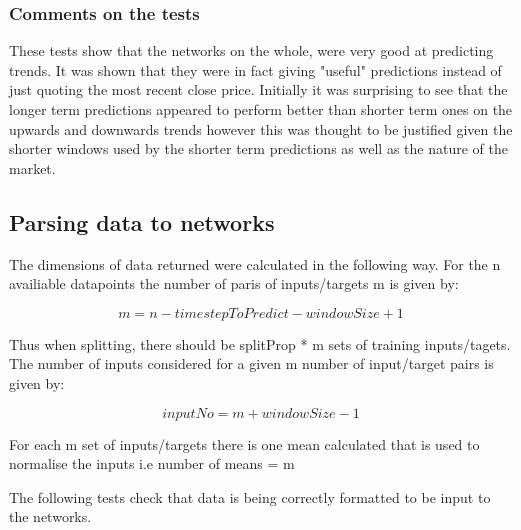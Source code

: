             \subsubsection{Comments on the tests}
            These tests show that the networks on the whole, were very good at predicting trends. It was shown that they were in fact giving "useful" predictions instead of just quoting the most recent close price. Initially it was surprising to see that the longer term predictions appeared to perform better than shorter term ones on the upwards and downwards trends however this was thought to be justified given the shorter windows used by the shorter term predictions as well as the nature of the market.

        \subsection{Parsing data to networks}
        The dimensions of data returned were calculated in the following way. For the n availiable datapoints the number of paris of inputs/targets m is given by:
        
        \begin{equation}
        m = n - timestepToPredict - windowSize + 1
        \end{equation}

        Thus when splitting, there should be splitProp * m sets of training inputs/tagets.
        The number of inputs considered for a given m number of input/target pairs is given by:

        \begin{equation}
            inputNo = m + windowSize - 1
        \end{equation}

        For each m set of inputs/targets there is one mean calculated that is used to normalise the inputs i.e number of means = m

        The following tests check that data is being correctly formatted to be input to the networks.

